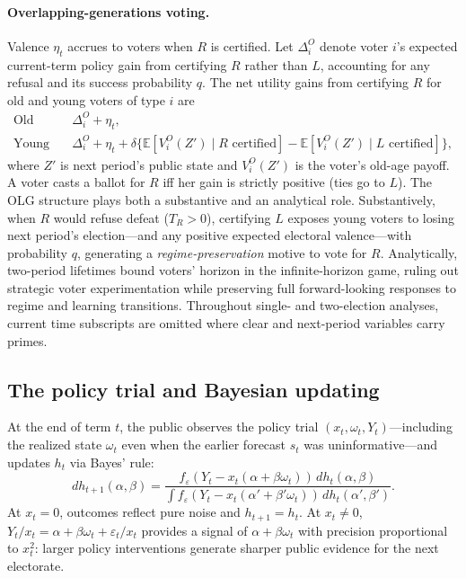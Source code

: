 \documentclass[11pt,letterpaper]{article}
\newcommand{\E}{\mathbb E}
\begin{document}
\paragraph{Overlapping-generations voting.}
Valence $\eta_t$ accrues to voters when $R$ is certified. Let $\Delta_i^O$ denote voter $i$'s expected current-term policy gain from certifying $R$ rather than $L$, accounting for any refusal and its success probability $q$. The net utility gains from certifying $R$ for old and young voters of type $i$ are
\begin{equation}
 \begin{aligned}
 \text{Old}\quad &\Delta_i^O+\eta_t,\\
 \text{Young}\quad &\Delta_i^O+\eta_t+
 \delta\big\{\E[V_i^O(Z')\mid R\text{ certified}]
             -\E[V_i^O(Z')\mid L\text{ certified}]\big\},
 \end{aligned}
 \label{eq:olg}
\end{equation}
where $Z'$ is next period's public state and $V_i^O(Z')$ is the voter's old-age payoff. A voter casts a ballot for $R$ iff her gain is strictly positive (ties go to $L$). The OLG structure plays both a substantive and an analytical role. Substantively, when $R$ would refuse defeat ($T_R>0$), certifying $L$ exposes young voters to losing next period's election---and any positive expected electoral valence---with probability $q$, generating a \emph{regime-preservation} motive to vote for $R$. Analytically, two-period lifetimes bound voters' horizon in the infinite-horizon game, ruling out strategic voter experimentation while preserving full forward-looking responses to regime and learning transitions. Throughout single- and two-election analyses, current time subscripts are omitted where clear and next-period variables carry primes.

\subsection{The policy trial and Bayesian updating}

At the end of term $t$, the public observes the policy trial $(x_t,\omega_t,Y_t)$---including the realized state $\omega_t$ even when the earlier forecast $s_t$ was uninformative---and updates $h_t$ via Bayes' rule:
\begin{equation}
 dh_{t+1}(\alpha,\beta)=
 \frac{f_\varepsilon(Y_t-x_t(\alpha+\beta\omega_t))\,dh_t(\alpha,\beta)}
 {\int f_\varepsilon(Y_t-x_t(\alpha'+\beta'\omega_t))\,dh_t(\alpha',\beta')} .
 \label{eq:bayes}
\end{equation}
At $x_t=0$, outcomes reflect pure noise and $h_{t+1}=h_t$. At $x_t\ne 0$, $Y_t/x_t=\alpha+\beta\omega_t+\varepsilon_t/x_t$ provides a signal of $\alpha+\beta\omega_t$ with precision proportional to $x_t^2$: larger policy interventions generate sharper public evidence for the next electorate.
\end{document}
